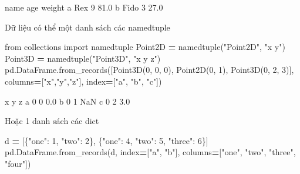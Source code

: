 \documentclass[
]{book}
\newenvironment{Shaded}{\begin{snugshade}}{\end{snugshade}}
\newcommand{\DecValTok}[1]{\textcolor[rgb]{0.00,0.00,0.81}{#1}}
\newcommand{\FloatTok}[1]{\textcolor[rgb]{0.00,0.00,0.81}{#1}}
\newcommand{\ImportTok}[1]{#1}
\newcommand{\NormalTok}[1]{#1}
\newcommand{\OperatorTok}[1]{\textcolor[rgb]{0.81,0.36,0.00}{\textbf{#1}}}
\newcommand{\StringTok}[1]{\textcolor[rgb]{0.31,0.60,0.02}{#1}}
\begin{document}
\begin{Shaded}
\begin{Highlighting}[]
\NormalTok{   name  age  weight}
\NormalTok{a   Rex    }\DecValTok{9}    \FloatTok{81.0}
\NormalTok{b  Fido    }\DecValTok{3}    \FloatTok{27.0}
\end{Highlighting}
\end{Shaded}

Dữ liệu có thể một danh sách các namedtuple

\begin{Shaded}
\begin{Highlighting}[]
\ImportTok{from}\NormalTok{ collections }\ImportTok{import}\NormalTok{ namedtuple}
\NormalTok{Point2D }\OperatorTok{=}\NormalTok{ namedtuple(}\StringTok{"Point2D"}\NormalTok{, }\StringTok{"x y"}\NormalTok{)}
\NormalTok{Point3D }\OperatorTok{=}\NormalTok{ namedtuple(}\StringTok{"Point3D"}\NormalTok{, }\StringTok{"x y z"}\NormalTok{)}
\NormalTok{pd.DataFrame.from\_records([Point3D(}\DecValTok{0}\NormalTok{, }\DecValTok{0}\NormalTok{, }\DecValTok{0}\NormalTok{), Point2D(}\DecValTok{0}\NormalTok{, }\DecValTok{1}\NormalTok{), Point3D(}\DecValTok{0}\NormalTok{, }\DecValTok{2}\NormalTok{, }\DecValTok{3}\NormalTok{)],}
\NormalTok{                          columns}\OperatorTok{=}\NormalTok{[}\StringTok{"x"}\NormalTok{,}\StringTok{"y"}\NormalTok{,}\StringTok{"z"}\NormalTok{], index}\OperatorTok{=}\NormalTok{[}\StringTok{"a"}\NormalTok{, }\StringTok{"b"}\NormalTok{, }\StringTok{"c"}\NormalTok{])}
\end{Highlighting}
\end{Shaded}

\begin{Shaded}
\begin{Highlighting}[]
\NormalTok{   x  y    z}
\NormalTok{a  }\DecValTok{0}  \DecValTok{0}  \FloatTok{0.0}
\NormalTok{b  }\DecValTok{0}  \DecValTok{1}\NormalTok{  NaN}
\NormalTok{c  }\DecValTok{0}  \DecValTok{2}  \FloatTok{3.0}
\end{Highlighting}
\end{Shaded}

Hoặc 1 danh sách các dict

\begin{Shaded}
\begin{Highlighting}[]
\NormalTok{d }\OperatorTok{=}\NormalTok{ [\{}\StringTok{"one"}\NormalTok{: }\DecValTok{1}\NormalTok{, }\StringTok{"two"}\NormalTok{: }\DecValTok{2}\NormalTok{\}, \{}\StringTok{"one"}\NormalTok{: }\DecValTok{4}\NormalTok{, }\StringTok{"two"}\NormalTok{: }\DecValTok{5}\NormalTok{, }\StringTok{"three"}\NormalTok{: }\DecValTok{6}\NormalTok{\}]}
\NormalTok{pd.DataFrame.from\_records(d, index}\OperatorTok{=}\NormalTok{[}\StringTok{"a"}\NormalTok{, }\StringTok{"b"}\NormalTok{], columns}\OperatorTok{=}\NormalTok{[}\StringTok{"one"}\NormalTok{, }\StringTok{"two"}\NormalTok{, }\StringTok{"three"}\NormalTok{, }\StringTok{"four"}\NormalTok{])}
\end{Highlighting}
\end{Shaded}
\end{document}
